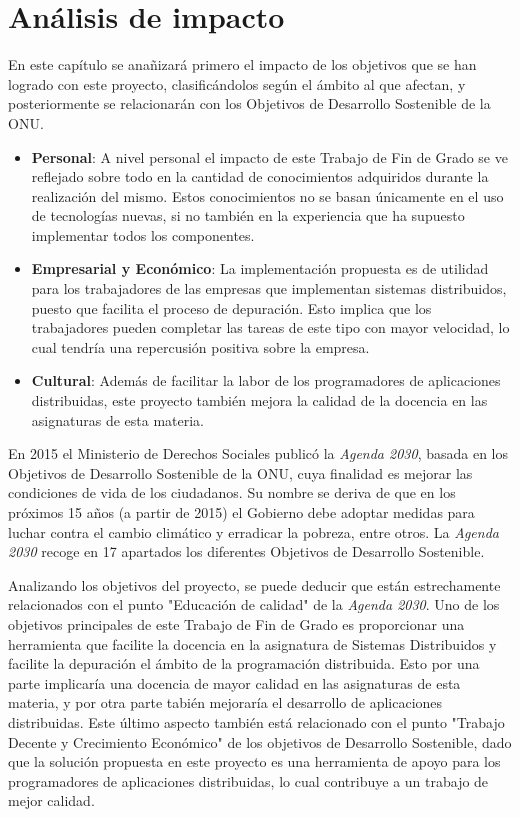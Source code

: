 \chapter{Análisis de impacto}

En este capítulo se anañizará primero el impacto de los objetivos que se han logrado con este proyecto, clasificándolos según el ámbito al que afectan, y posteriormente se relacionarán con los Objetivos de Desarrollo Sostenible de la ONU.

\begin{itemize}
\item \textbf{Personal}: A nivel personal el impacto de este Trabajo de Fin de Grado se ve reflejado sobre todo en la cantidad de conocimientos adquiridos durante la realización del mismo. Estos conocimientos no se basan únicamente en el uso de tecnologías nuevas, si no también en la experiencia que ha supuesto implementar todos los componentes.

\item \textbf{Empresarial y Económico}: La implementación propuesta es de utilidad para los trabajadores de las empresas que implementan sistemas distribuidos, puesto que facilita el proceso de depuración. Esto implica que los trabajadores pueden completar las tareas de este tipo con mayor velocidad, lo cual tendría una repercusión positiva sobre la empresa.

\item \textbf{Cultural}: Además de facilitar la labor de los programadores de aplicaciones distribuidas, este proyecto también mejora la calidad de la docencia en las asignaturas de esta materia.
\end{itemize}

En 2015 el Ministerio de Derechos Sociales publicó la \textit{Agenda 2030}, basada en los Objetivos de Desarrollo Sostenible de la ONU, cuya finalidad es mejorar las condiciones de vida de los ciudadanos. Su nombre se deriva de que en los próximos 15 años (a partir de 2015) el Gobierno debe adoptar medidas para luchar contra el cambio climático y erradicar la pobreza, entre otros. La \textit{Agenda 2030} recoge en 17 apartados los diferentes Objetivos de Desarrollo Sostenible. 

Analizando los objetivos del proyecto, se puede deducir que están estrechamente relacionados con el punto "Educación de calidad" de la \textit{Agenda 2030}. Uno de los objetivos principales de este Trabajo de Fin de Grado es proporcionar una herramienta que facilite la docencia en la asignatura de Sistemas Distribuidos y facilite la depuración el ámbito de la programación distribuida. Esto por una parte implicaría una docencia de mayor calidad en las asignaturas de esta materia, y por otra parte tabién mejoraría el desarrollo de aplicaciones distribuidas. Este último aspecto también está relacionado con el punto "Trabajo Decente y Crecimiento Económico" de los objetivos de Desarrollo Sostenible, dado que la solución propuesta en este proyecto es una herramienta de apoyo para los programadores de aplicaciones distribuidas, lo cual contribuye a un trabajo de mejor calidad.
